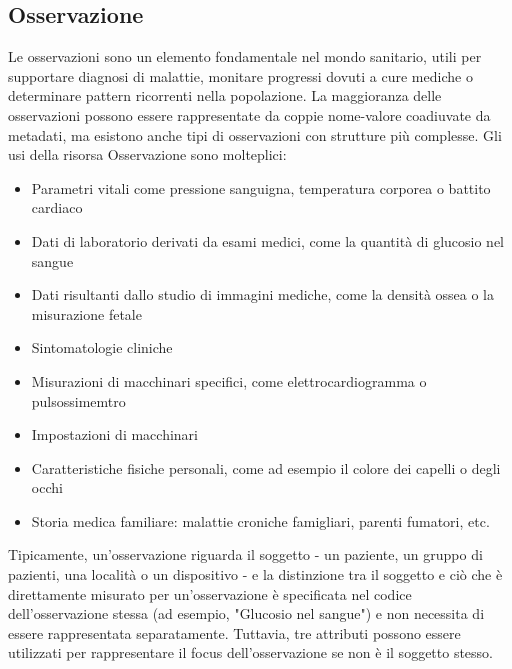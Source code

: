 \documentclass{article}
\begin{document}
\subsection{Osservazione}
Le osservazioni sono un elemento fondamentale nel mondo sanitario, utili per supportare diagnosi di malattie, monitare progressi
dovuti a cure mediche o determinare pattern ricorrenti nella popolazione.
La maggioranza delle osservazioni possono essere rappresentate da coppie nome-valore coadiuvate da metadati, ma esistono anche tipi di osservazioni con strutture più complesse.
Gli usi della risorsa Osservazione sono molteplici:
\begin{itemize}
    \item Parametri vitali come pressione sanguigna, temperatura corporea o battito cardiaco
    \item Dati di laboratorio derivati da esami medici, come la quantità di glucosio nel sangue
    \item Dati risultanti dallo studio di immagini mediche, come la densità ossea o la misurazione fetale
    \item Sintomatologie cliniche
    \item Misurazioni di macchinari specifici, come elettrocardiogramma o pulsossimemtro
    \item Impostazioni di macchinari
    \item Caratteristiche fisiche personali, come ad esempio il colore dei capelli o degli occhi
    \item Storia medica familiare: malattie croniche famigliari, parenti fumatori, etc.
\end{itemize}
Tipicamente, un'osservazione riguarda il soggetto - un paziente, un gruppo di pazienti, una località o un dispositivo - e la distinzione tra il soggetto e ciò che è direttamente
misurato per un'osservazione è specificata nel codice dell'osservazione stessa (ad esempio, "Glucosio nel sangue") e non necessita di essere rappresentata separatamente.
Tuttavia, tre attributi possono essere utilizzati per rappresentare il focus dell'osservazione se non è il soggetto stesso.
\end{document}
